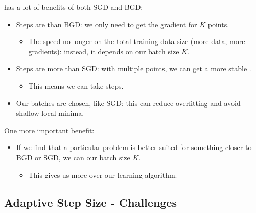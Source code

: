             \begin{concept}
                 has a lot of benefits of both SGD and BGD:
                
                \begin{itemize}
                    \item Steps are  than BGD: we only need to get the gradient for $K$ points.
                        \begin{itemize}
                            \item The speed no longer  on the total training data size (more data, more gradients): instead, it depends on our batch size $K$.
                        \end{itemize}
                        
                    \item Steps are more  than SGD: with multiple points, we can get a more stable .
                        \begin{itemize}
                            \item This means we can take  steps.
                        \end{itemize}
                    
                    \item Our batches are  chosen, like SGD: this can reduce overfitting and avoid shallow local minima.
                \end{itemize}
                
                One more important benefit:
                
                \begin{itemize}
                    \item If we find that a particular problem is better suited for something closer to BGD or SGD, we can  our batch size $K$.
                        \begin{itemize}
                            \item This gives us more  over our learning algorithm.
                        \end{itemize}
                \end{itemize}
            \end{concept}
        
    \secdiv
    
    \subsection{Adaptive Step Size - Challenges}
    
